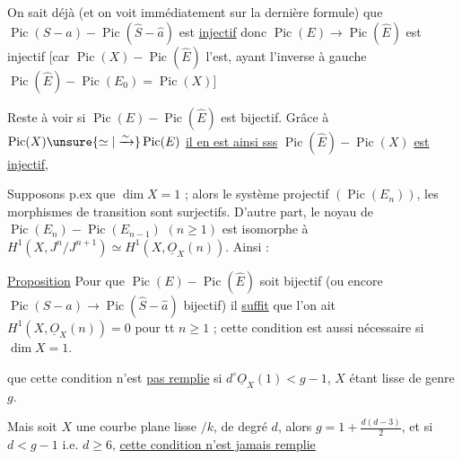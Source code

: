 On sait déjà   (et on voit immédiatement sur la dernière formule) que $\operatorname{Pic}(S-a)\mathbin{-}\operatorname{Pic}(\widehat S-\hat a)$ est \uline{injectif} donc $\operatorname{Pic}(E)\longrightarrow\operatorname{Pic}(\widehat E)$ est injectif [car $\operatorname{Pic}(X)\mathbin{-}\operatorname{Pic}(\widehat E)$ l'est, ayant l'inverse à gauche $\operatorname{Pic}(\widehat E)\mathbin{-}\operatorname{Pic}(E_0)=\operatorname{Pic}(X)$]

Reste à voir si $\operatorname{Pic}(E)\mathbin{-}\operatorname{Pic}(\widehat E)$ est bijectif. Grâce à $\operatorname{Pic}(X)\unsure{\simeq|\xrightarrow{\sim}}\operatorname{Pic}(E)$
\uline{il en est ainsi sss} $\operatorname{Pic}(\widehat E)\mathbin{-}\operatorname{Pic}(X)$ \uline{est injectif}, 

Supposons p.ex que $\dim X=1$ ; alors  le système projectif $(\operatorname{Pic}(E_n))$, les morphismes de transition sont surjectifs. D'autre part,  le noyau de $\operatorname{Pic}(E_n)\mathbin{-}\operatorname{Pic}(E_{n-1})$ $(n\geq1)$ est isomorphe à $H^1(X,J^n/J^{n+1})\simeq H^1(X,\underline O_X(n))$. Ainsi : 

\uline{Proposition} Pour que $\operatorname{Pic}(E)\mathbin{-}\operatorname{Pic}(\widehat E)$ soit bijectif (ou encore $\operatorname{Pic}(S-a)\longrightarrow\operatorname{Pic}(\widehat S-\hat a)$ bijectif) il  \uline{suffit} que l'on ait $H^1(X,\underline O_X(n))=0$ pour tt $n\geq1$ ; cette condition est aussi nécessaire si $\dim X=1$.

 que cette condition n'est \uline{pas remplie} si $d^\circ\underline O_X(1)<g-1$, $X$ étant lisse  de genre $g$.

Mais soit $X$  une courbe plane lisse $/k$, de degré $d$, alors $g=1+\frac{d(d-3)}{2}$, et si $d<g-1$ i.e. $d\geq6$, \uline{cette condition n'est jamais remplie}
